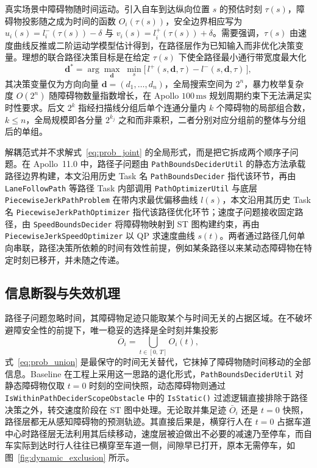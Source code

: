 \documentclass[a4paper,zihao=5]{ctexart}
\theoremstyle{definition}
\begin{document}
真实场景中障碍物随时间运动。引入自车到达纵向位置 $s$ 的预估时刻 $\tau(s)$，障碍物投影随之成为时间的函数 $O_i(\tau(s))$，安全边界相应写为 $u_i(s) = l_i^{-}(\tau(s)) - \delta$ 与 $v_i(s) = l_i^{+}(\tau(s)) + \delta$。需要强调，$\tau(s)$ 由速度曲线反推或二阶运动学模型估计得到，在路径层作为已知输入而非优化决策变量。理想的联合路径决策目标是在给定 $\tau(s)$ 下使全路径最小通行带宽度最大化
\begin{equation}
    \mathbf{d}^{*} = \arg\max_{\mathbf{d}} \;\min_{s} \big[\,l^{+}(s, \mathbf{d}, \tau) - l^{-}(s, \mathbf{d}, \tau)\,\big],
    \label{eq:prob_joint}
\end{equation}
其决策变量仅为方向向量 $\mathbf{d} = (d_1, \ldots, d_n)$，全局搜索空间为 $2^n$，暴力枚举复杂度 $O(2^n)$ 随障碍物数量指数增长，在 Apollo $100\,\mathrm{ms}$ 规划周期约束下无法满足实时性要求。后文 $2^k$ 指经扫描线分组后单个连通分量内 $k$ 个障碍物的局部组合数，$k \leq n$，全局规模即各分量 $2^{k_j}$ 之和而非乘积，二者分别对应分组前的整体与分组后的单组。

解耦范式并不求解式~\eqref{eq:prob_joint} 的全局形式，而是把它拆成两个顺序子问题。在 Apollo~11.0 中，路径子问题由 \texttt{PathBoundsDeciderUtil} 的静态方法承载路径边界构建，本文沿用历史 Task 名 \texttt{PathBoundsDecider} 指代该环节，再由 \texttt{LaneFollowPath} 等路径 Task 内部调用 \texttt{PathOptimizerUtil} 与底层 \texttt{PiecewiseJerkPathProblem} 在带内求最优偏移曲线 $l(s)$，本文沿用其历史 Task 名 \texttt{PiecewiseJerkPathOptimizer} 指代该路径优化环节；速度子问题接收固定路径，由 \texttt{SpeedBoundsDecider} 将障碍物映射到 ST 图构建约束，再由 \texttt{PiecewiseJerkSpeedOptimizer} 以 QP 求速度曲线 $s(t)$。两者通过路径几何单向串联，路径决策所依赖的时间有效性前提，例如某条路径以来某动态障碍物在特定时刻已移开，并未随之传递。

\subsection{信息断裂与失效机理}
\label{subsec:union_projection}

路径子问题忽略时间，其障碍物足迹只能取某个与时间无关的占据区域。在不破坏避障安全性的前提下，唯一稳妥的选择是全时刻并集投影
\begin{equation}
    \bar{O}_i = \bigcup_{t \in [0,\,T]} O_i(t),
    \label{eq:prob_union}
\end{equation}
式~\eqref{eq:prob_union} 是最保守的时间无关替代，它抹掉了障碍物随时间移动的全部信息。Baseline 在工程上采用这一思路的退化形式，\texttt{PathBoundsDeciderUtil} 对静态障碍物仅取 $t{=}0$ 时刻的空间快照，动态障碍物则通过 \texttt{IsWithinPathDeciderScopeObstacle} 中的 \texttt{IsStatic()} 过滤逻辑直接排除于路径决策之外，转交速度阶段在 ST 图中处理。无论取并集足迹 $\bar{O}_i$ 还是 $t{=}0$ 快照，路径层都无从感知障碍物的预测轨迹。其直接后果是，横穿行人在 $t{=}0$ 占据车道中心时路径层无法利用其后续移动，速度层被迫做出不必要的减速乃至停车，而自车实际到达时行人往往已横穿至车道一侧，间隙早已打开，原本无需停车，如图~\ref{fig:dynamic_exclusion} 所示。
\end{document}
